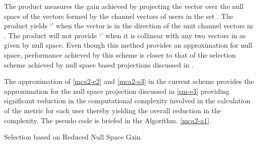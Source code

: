 The product measures the gain achieved by projecting the vector  over the null space of the vectors formed by the channel vectors of users in the set . The product yields `' when the vector  is in the direction of the unit channel vectors in . The product will not provide `' when it is collinear with any two vectors in  as given by null space. Even though this method provides an approximation for null space, performance achieved by this scheme is closer to that of the selection scheme achieved by null space based projections discussed in \cite{sus2006zfbf,antti_user_selection,icsps2010}. 

The approximation of \eqref{mca2-e2} and \eqref{mca2-e3} in the current scheme provides the approximation for the null space projection discussed in \eqref{sm-e3} providing significant reduction in the computational complexity involved in the calculation of the metric for each user thereby yielding the overall reduction in the complexity. The pseudo code is briefed in the Algorithm. \ref{mca2-a1}.

\begin{algorithm}
 \SetAlgoLined
 \DontPrintSemicolon
 \caption{Selection based on Reduced Null Space Gain}
 \label{mca2-a1}
\end{algorithm}
